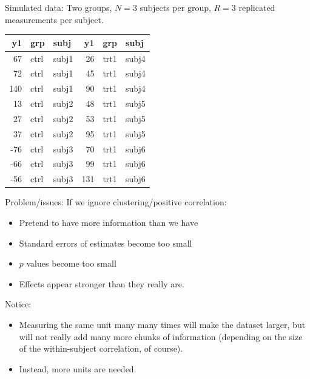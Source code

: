 \documentclass[
  ignorenonframetext,
]{beamer}
\providecommand{\tightlist}{%
  \setlength{\itemsep}{0pt}\setlength{\parskip}{0pt}}
\begin{document}
\begin{frame}

Simulated data: Two groups, \(N=3\) subjects per group, \(R=3\)
replicated measurements per subject.

\small

\begin{tabular}{rllrll}
\toprule
y1 & grp & subj & y1 & grp & subj\\
\midrule
67 & ctrl & subj1 & 26 & trt1 & subj4\\
72 & ctrl & subj1 & 45 & trt1 & subj4\\
140 & ctrl & subj1 & 90 & trt1 & subj4\\
13 & ctrl & subj2 & 48 & trt1 & subj5\\
27 & ctrl & subj2 & 53 & trt1 & subj5\\
37 & ctrl & subj2 & 95 & trt1 & subj5\\
-76 & ctrl & subj3 & 70 & trt1 & subj6\\
-66 & ctrl & subj3 & 99 & trt1 & subj6\\
-56 & ctrl & subj3 & 131 & trt1 & subj6\\
\bottomrule
\end{tabular}

\begin{block}{\normalsize}

Problem/issues: If we ignore clustering/positive correlation:

\begin{itemize}
\tightlist
\item
  Pretend to have more information than we have
\item
  Standard errors of estimates become too small
\item
  \(p\) values become too small
\item
  Effects appear stronger than they really are.
\end{itemize}

Notice:

\begin{itemize}
\tightlist
\item
  Measuring the same unit many many times will make the dataset larger,
  but will not really add many more chunks of information (depending on
  the size of the within-subject correlation, of course).
\item
  Instead, more units are needed.
\end{itemize}

\end{block}

\end{frame}
\end{document}
